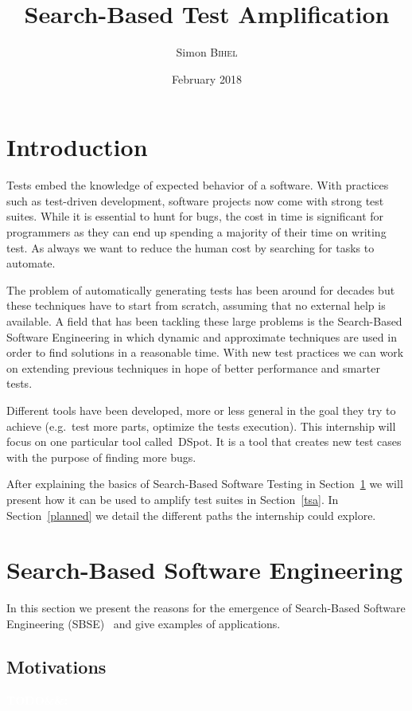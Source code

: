 \documentclass[11pt]{sdm}
\title{Search-Based Test Amplification}
\author{Simon \textsc{Bihel}}
\date{February 2018}
\newcommand{\todo}[1]{\colorbox{Red!75}{\textcolor{white}{\textbf{TODO\ifx&#1&\else: #1\fi}}}}
\newcommand{\dspot}{DSpot\xspace}
\begin{document}
\section*{Introduction}
\label{intro}
Tests embed the knowledge of expected behavior of a software.
With practices such as test-driven development, software projects now come with strong test suites.
While it is essential to hunt for bugs, the cost in time is significant for programmers as they can end up spending a majority of their time on writing test.
As always we want to reduce the human cost by searching for tasks to automate.

The problem of automatically generating tests has been around for decades but these techniques have to start from scratch, assuming that no external help is available.
A field that has been tackling these large problems is the Search-Based Software Engineering in which dynamic and approximate techniques are used in order to find solutions in a reasonable time.
With new test practices we can work on extending previous techniques in hope of better performance and smarter tests.

Different tools have been developed, more or less general in the goal they try to achieve (e.g.\ test more parts, optimize the tests execution).
This internship will focus on one particular tool called~\dspot{}.
It is a tool that creates new test cases with the purpose of finding more bugs.

After explaining the basics of Search-Based Software Testing in Section~\ref{sbse} we will present how it can be used to amplify test suites in Section~\ref{tsa}.
In Section~\ref{planned} we detail the different paths the internship could explore.


\section{Search-Based Software Engineering}
\label{sbse}

In this section we present the reasons for the emergence of Search-Based Software Engineering (SBSE)~\cite{harman2001search,mcminn2011search} and give examples of applications.

\subsection{Motivations}
\label{motiv}
\todo{}
\end{document}
